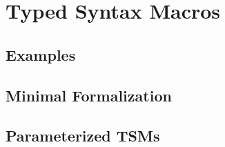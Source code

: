\chapter{Typed Syntax Macros}
\section{Examples}
\section{Minimal Formalization}
\section{Parameterized TSMs}
